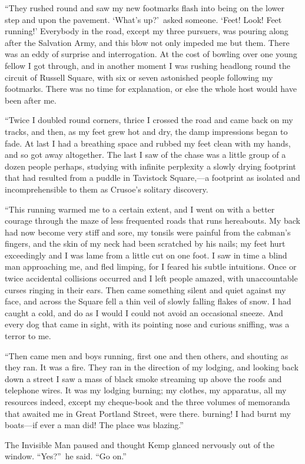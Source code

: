 “They rushed round and saw my new footmarks flash into being on the lower step and upon the pavement. ‘What’s up?’\ asked someone. ‘Feet! Look! Feet running!’ Everybody in the road, except my three pursuers, was pouring along after the Salvation Army, and this blow not only impeded me but them. There was an eddy of surprise and interrogation. At the cost of bowling over one young fellow I got through, and in another moment I was rushing headlong round the circuit of Russell Square, with six or seven astonished people following my footmarks. There was no time for explanation, or else the whole host would have been after me.

“Twice I doubled round corners, thrice I crossed the road and came back on my tracks, and then, as my feet grew hot and dry, the damp impressions began to fade. At last I had a breathing space and rubbed my feet clean with my hands, and so got away altogether. The last I saw of the chase was a little group of a dozen people perhaps, studying with infinite perplexity a slowly drying footprint that had resulted from a puddle in Tavistock Square,—a footprint as isolated and incomprehensible to them as Crusoe’s solitary discovery.

“This running warmed me to a certain extent, and I went on with a better courage through the maze of less frequented roads that runs hereabouts. My back had now become very stiff and sore, my tonsils were painful from the cabman’s fingers, and the skin of my neck had been scratched by his nails; my feet hurt exceedingly and I was lame from a little cut on one foot. I saw in time a blind man approaching me, and fled limping, for I feared his subtle intuitions. Once or twice accidental collisions occurred and I left people amazed, with unaccountable curses ringing in their ears. Then came something silent and quiet against my face, and across the Square fell a thin veil of slowly falling flakes of snow. I had caught a cold, and do as I would I could not avoid an occasional sneeze. And every dog that came in sight, with its pointing nose and curious sniffing, was a terror to me.

“Then came men and boys running, first one and then others, and shouting as they ran. It was a fire. They ran in the direction of my lodging, and looking back down a street I saw a mass of black smoke streaming up above the roofs and telephone wires. It was my lodging burning; my clothes, my apparatus, all my resources indeed, except my cheque-book and the three volumes of memoranda that awaited me in Great Portland Street, were there. burning! I had burnt my boats—if ever a man did! The place was blazing.”

The Invisible Man paused and thought Kemp glanced nervously out of the window. “Yes?”\ he said. “Go on.”